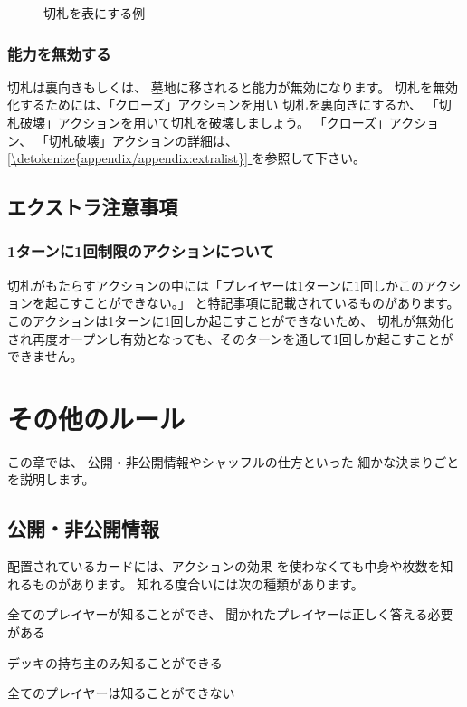 \documentclass[letterpaper,10pt,dvipdfmx]{sphinxmanual}
\begin{document}
\begin{figure}[htbp]
\centering
\capstart

\noindent{}
\caption{切札を表にする例}\label{\detokenize{common/common:id59}}\label{\detokenize{common/common:trump-open}}\end{figure}


\subsubsection{能力を無効する}
\label{\detokenize{common/common:id40}}
\sphinxAtStartPar
切札は裏向きもしくは、
墓地に移されると能力が無効になります。
切札を無効化するためには、「クローズ」アクションを用い
切札を裏向きにするか、
「切札破壊」アクションを用いて切札を破壊しましょう。
「クローズ」アクション、
「切札破壊」アクションの詳細は、 \hyperref[\detokenize{appendix/appendix:extralist}]{\ref{\detokenize{appendix/appendix:extralist}} } を参照して下さい。


\subsection{エクストラ注意事項}
\label{\detokenize{common/common:id41}}

\subsubsection{1ターンに1回制限のアクションについて}
\label{\detokenize{common/common:id42}}
\sphinxAtStartPar
切札がもたらすアクションの中には「プレイヤーは1ターンに1回しかこのアクションを起こすことができない。」
と特記事項に記載されているものがあります。
このアクションは1ターンに1回しか起こすことができないため、
切札が無効化され再度オープンし有効となっても、そのターンを通して1回しか起こすことができません。


\section{その他のルール}
\label{\detokenize{common/common:id43}}
\sphinxAtStartPar
この章では、
公開・非公開情報やシャッフルの仕方といった
細かな決まりごとを説明します。


\subsection{公開・非公開情報}
\label{\detokenize{common/common:id44}}
\sphinxAtStartPar
配置されているカードには、アクションの効果
を使わなくても中身や枚数を知れるものがあります。
知れる度合いには次の種類があります。
\begin{description}
\sphinxAtStartPar
全てのプレイヤーが知ることができ、
聞かれたプレイヤーは正しく答える必要がある

\sphinxAtStartPar
デッキの持ち主のみ知ることができる

\sphinxAtStartPar
全てのプレイヤーは知ることができない

\end{description}
\end{document}
